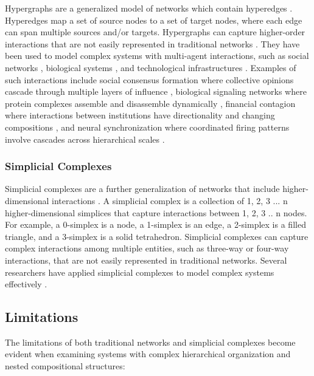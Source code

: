 Hypergraphs are a generalized model of networks which contain hyperedges \citep{berge1984hypergraphs, battiston2020networks}. Hyperedges map a set of source nodes to a set of target nodes, where each edge can span multiple sources and/or targets. Hypergraphs can capture higher-order interactions that are not easily represented in traditional networks \citep{benson2016higher}. They have been used to model complex systems with multi-agent interactions, such as social networks \citep{zhou2007learning}, biological systems \citep{klamt2009hypergraphs}, and technological infrastructures \citep{xu2013hypernetwork}. Examples of such interactions include social consensus formation where collective opinions cascade through multiple layers of influence \citep{neuhäuser2021consensus}, biological signaling networks where protein complexes assemble and disassemble dynamically \citep{ramadan2020hypergraph}, financial contagion where interactions between institutions have directionality and changing compositions \citep{hüser2020financial}, and neural synchronization where coordinated firing patterns involve cascades across hierarchical scales \citep{petri2014homological, giusti2016two, sizemore2018importance}.

\subsubsection{Simplicial Complexes}

Simplicial complexes are a further generalization of networks that include higher-dimensional interactions \citep{petri2014homological, giusti2016two, sizemore2018importance}. A simplicial complex is a collection of 1, 2, 3 ... n higher-dimensional simplices that capture interactions between 1, 2, 3 .. n nodes. For example, a 0-simplex is a node, a 1-simplex is an edge, a 2-simplex is a filled triangle, and a 3-simplex is a solid tetrahedron.  Simplicial complexes can capture complex interactions among multiple entities, such as three-way or four-way interactions, that are not easily represented in traditional networks. Several researchers have applied simplicial complexes to model complex systems effectively \citep{petri2014homological, giusti2016two, sizemore2018importance}.

\subsection{Limitations}

The limitations of both traditional networks and simplicial complexes become evident when examining systems with complex hierarchical organization and nested compositional structures:

